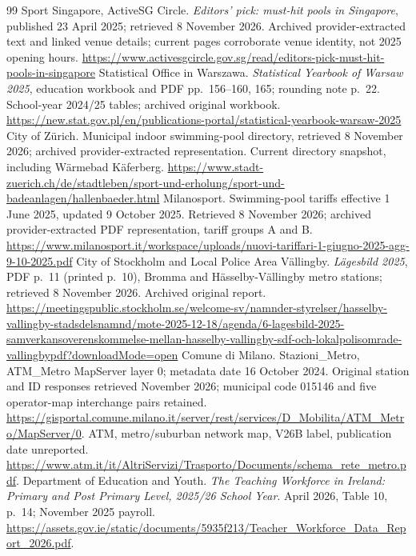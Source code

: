 \begin{thebibliography}{99}
 Sport Singapore, ActiveSG Circle. \textit{Editors' pick:
must-hit pools in Singapore}, published 23 April 2025; retrieved 8 November
2026. Archived provider-extracted text and linked venue details; current
pages corroborate venue identity, not 2025 opening hours.
\url{https://www.activesgcircle.gov.sg/read/editors-pick-must-hit-pools-in-singapore}
 Statistical Office in Warszawa. \textit{Statistical
Yearbook of Warsaw 2025}, education workbook and PDF pp.~156--160, 165;
rounding note p.~22. School-year 2024/25 tables; archived original workbook.
\url{https://new.stat.gov.pl/en/publications-portal/statistical-yearbook-warsaw-2025}
 City of Z\"urich. Municipal indoor swimming-pool directory,
retrieved 8 November 2026; archived provider-extracted representation.
Current directory snapshot, including W\"armebad K\"aferberg.
\url{https://www.stadt-zuerich.ch/de/stadtleben/sport-und-erholung/sport-und-badeanlagen/hallenbaeder.html}
 Milanosport. Swimming-pool tariffs effective 1 June
2025, updated 9 October 2025. Retrieved 8 November 2026; archived
provider-extracted PDF representation, tariff groups A and B.
\url{https://www.milanosport.it/workspace/uploads/nuovi-tariffari-1-giugno-2025-agg-9-10-2025.pdf}
 City of Stockholm and Local Police Area
V\"allingby. \textit{L\"agesbild 2025}, PDF p.~11 (printed p.~10),
Bromma and H\"asselby-V\"allingby metro stations; retrieved 8 November 2026.
Archived original report.
\begingroup\def\UrlBreaks{\do\/\do-\do\?}\url{https://meetingspublic.stockholm.se/welcome-sv/namnder-styrelser/hasselby-vallingby-stadsdelsnamnd/mote-2025-12-18/agenda/6-lagesbild-2025-samverkansoverenskommelse-mellan-hasselby-vallingby-sdf-och-lokalpolisomrade-vallingbypdf?downloadMode=open}\endgroup
{} Comune di Milano. Stazioni\_Metro, ATM\_Metro MapServer layer 0; metadata date 16 October 2024. Original station and ID responses retrieved November 2026; municipal code 015146 and five operator-map interchange pairs retained.
\url{https://gisportal.comune.milano.it/server/rest/services/D_Mobilita/ATM_Metro/MapServer/0}.
ATM, metro/suburban network map, V26B label, publication date unreported.
\url{https://www.atm.it/it/AltriServizi/Trasporto/Documents/schema_rete_metro.pdf}.
 Department of Education and Youth.
\textit{The Teaching Workforce in Ireland: Primary and Post Primary Level,
2025/26 School Year}. April 2026, Table 10, p.~14; November 2025 payroll.
\url{https://assets.gov.ie/static/documents/5935f213/Teacher_Workforce_Data_Report_2026.pdf}.

\end{thebibliography}
